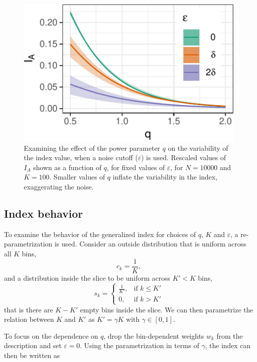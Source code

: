 \documentclass[]{interact}
\theoremstyle{plain}%
\theoremstyle{definition}
\theoremstyle{remark}
\begin{document}
\begin{figure}

{\centering \includegraphics[width=0.5\linewidth]{section_pursuit_files/figure-latex/noise-1} 

}

\caption{Examining the  effect of the power parameter $q$ on the variability of the  index value, when a noise cutoff ($\varepsilon$) is used. Rescaled values of $I_A$ shown as a function of $q$, for fixed values of $\varepsilon$, for $N=10000$ and $K=100$. Smaller values of  $q$ inflate the variability in the index, exaggerating  the noise.}\label{fig:noise}
\end{figure}

\hypertarget{index-behavior}{%
\subsection{\texorpdfstring{Index behavior
\label{sec:behaviour}}{Index behavior }}\label{index-behavior}}

To examine the behavior of the generalized index for choices of \(q\),
\(K\) and \(\varepsilon\), a re-parametrization is used. Consider an
outside distribution that is uniform across all \(K\) bins,
\begin{equation}
c_{k} = \frac{1}{K},
\end{equation} and a distribution inside the slice to be uniform across
\(K' < K\) bins, \begin{equation}
s_{k} = \begin{cases}
    \frac{1}{K'}, & \text{if $k \leq K'$}\\
    0, & \text{if $k > K'$}
  \end{cases}
\end{equation} that is there are \(K-K'\) empty bins inside the slice.
We can then parametrize the relation between \(K\) and \(K'\) as
\(K' = \gamma K\) with \(\gamma \in [0,1]\).

To focus on the dependence on \(q\), drop the bin-dependent weights
\(w_k\) from the description and set \(\varepsilon=0\). Using the
parametrization in terms of \(\gamma\), the index can then be written as
\end{document}
